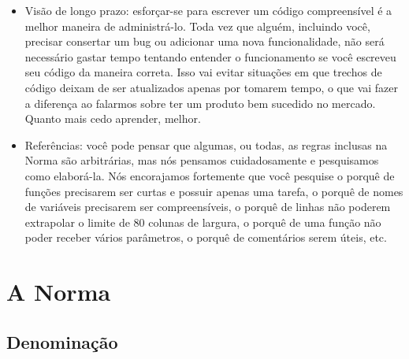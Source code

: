 \documentclass{42-pt}
\begin{document}
\begin{itemize}
    \item Visão de longo prazo: esforçar-se para escrever um código compreensível
      é a melhor maneira de administrá-lo. Toda vez que alguém, incluindo
      você, precisar consertar um bug ou adicionar uma nova
      funcionalidade, não será necessário gastar tempo tentando entender
      o funcionamento se você escreveu seu código da maneira correta. Isso
      vai evitar situações em que trechos de código deixam de ser
      atualizados apenas por tomarem tempo, o que vai fazer a diferença
      ao falarmos sobre ter um produto bem sucedido no mercado. Quanto
      mais cedo aprender, melhor.


    \item Referências: você pode pensar que algumas, ou todas, as regras
      inclusas na Norma são arbitrárias, mas nós pensamos cuidadosamente e
      pesquisamos como elaborá-la. Nós encorajamos fortemente que você
      pesquise o porquê de funções precisarem ser curtas e possuir apenas
      uma tarefa, o porquê de nomes de variáveis precisarem ser
      compreensíveis, o porquê de linhas não poderem extrapolar o limite
      de 80 colunas de largura, o porquê de uma função não poder receber
      vários parâmetros, o porquê de comentários serem úteis, etc.


    \end{itemize}


\newpage

\chapter{A Norma}


    \section{Denominação}
\end{document}
